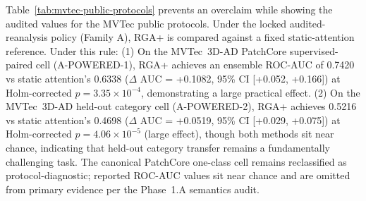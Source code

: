 \documentclass[10pt,conference]{IEEEtran}
\begin{document}

Table~\ref{tab:mvtec-public-protocols} prevents an overclaim while showing the audited values for the MVTec public protocols. Under the locked audited-reanalysis policy (Family A), RGA+ is compared against a fixed static-attention reference. Under this rule:
(1) On the MVTec~3D-AD PatchCore supervised-paired cell (A-POWERED-1), RGA+ achieves an ensemble ROC-AUC of 0.7420 vs static attention's 0.6338 ($\Delta$ AUC = +0.1082, 95\% CI [+0.052, +0.166]) at Holm-corrected $p = 3.35\times 10^{-4}$, demonstrating a large practical effect.
(2) On the MVTec~3D-AD held-out category cell (A-POWERED-2), RGA+ achieves 0.5216 vs static attention's 0.4698 ($\Delta$ AUC = +0.0519, 95\% CI [+0.029, +0.075]) at Holm-corrected $p = 4.06\times 10^{-5}$ (large effect), though both methods sit near chance, indicating that held-out category transfer remains a fundamentally challenging task.
The canonical PatchCore one-class cell remains reclassified as protocol-diagnostic; reported ROC-AUC values sit near chance and are omitted from primary evidence per the Phase~1.A semantics audit.
\end{document}
